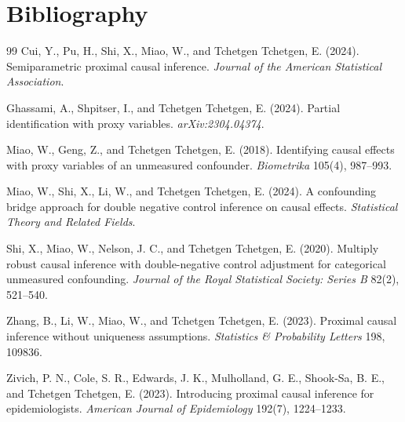\documentclass[11pt]{article}
\theoremstyle{definition}
\theoremstyle{plain}
\theoremstyle{remark}
\begin{document}
\section*{Bibliography}
\begin{thebibliography}{99}
Cui, Y., Pu, H., Shi, X., Miao, W., and Tchetgen Tchetgen, E. (2024). Semiparametric proximal causal inference. \emph{Journal of the American Statistical Association}.

Ghassami, A., Shpitser, I., and Tchetgen Tchetgen, E. (2024). Partial identification with proxy variables. \emph{arXiv:2304.04374}.

Miao, W., Geng, Z., and Tchetgen Tchetgen, E. (2018). Identifying causal effects with proxy variables of an unmeasured confounder. \emph{Biometrika} 105(4), 987--993.

Miao, W., Shi, X., Li, W., and Tchetgen Tchetgen, E. (2024). A confounding bridge approach for double negative control inference on causal effects. \emph{Statistical Theory and Related Fields}.

Shi, X., Miao, W., Nelson, J. C., and Tchetgen Tchetgen, E. (2020). Multiply robust causal inference with double-negative control adjustment for categorical unmeasured confounding. \emph{Journal of the Royal Statistical Society: Series B} 82(2), 521--540.

Zhang, B., Li, W., Miao, W., and Tchetgen Tchetgen, E. (2023). Proximal causal inference without uniqueness assumptions. \emph{Statistics \& Probability Letters} 198, 109836.

Zivich, P. N., Cole, S. R., Edwards, J. K., Mulholland, G. E., Shook-Sa, B. E., and Tchetgen Tchetgen, E. (2023). Introducing proximal causal inference for epidemiologists. \emph{American Journal of Epidemiology} 192(7), 1224--1233.
\end{thebibliography}
\end{document}
